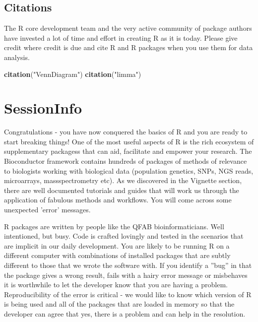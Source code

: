 \documentclass[a4paper]{book}
\newenvironment{Shaded}{\begin{snugshade}}{\end{snugshade}}
\newcommand{\KeywordTok}[1]{\textcolor[rgb]{0.13,0.29,0.53}{\textbf{{#1}}}}
\newcommand{\StringTok}[1]{\textcolor[rgb]{0.31,0.60,0.02}{{#1}}}
\newcommand{\NormalTok}[1]{{#1}}
\renewenvironment{Shaded}
{\vspace{1.5em}\begin{leftbar}\begin{snugshade}}
{\end{snugshade}\end{leftbar}\vspace{3pt}}
\begin{document}
\subsection{Citations}\label{citations}

The R core development team and the very active community of package
authors have invested a lot of time and effort in creating R as it is
today. Please give credit where credit is due and cite R and R packages
when you use them for data analysis.

\begin{Shaded}
\begin{Highlighting}[]
\KeywordTok{citation}\NormalTok{(}\StringTok{"VennDiagram"}\NormalTok{)}
\KeywordTok{citation}\NormalTok{(}\StringTok{"limma"}\NormalTok{)}
\end{Highlighting}
\end{Shaded}

\section{SessionInfo}\label{sessioninfo}

Congratulations - you have now conquered the basics of R and you are
ready to start breaking things! One of the most useful aspects of R is
the rich ecosystem of supplementary packagess that can aid, facilitate
and empower your research. The Bioconductor framework contains hundreds
of packages of methods of relevance to biologists working with
biological data (population genetics, SNPs, NGS reads, microarrays,
massspectrometry etc). As we discovered in the Vignette section, there
are well documented tutorials and guides that will work us through the
application of fabulous methods and workflows. You will come across some
unexpected 'error' messages.

R packages are written by people like the QFAB bioinformaticians. Well
intentioned, but busy. Code is crafted lovingly and tested in the
scenarios that are implicit in our daily development. You are likely to
be running R on a different computer with combinations of installed
packages that are subtly different to those that we wrote the software
with. If you identify a ''bug'' in that the package gives a wrong
result, fails with a hairy error message or misbehaves it is worthwhile
to let the developer know that you are having a problem. Reproducibility
of the error is critical - we would like to know which version of R is
being used and all of the packages that are loaded in memory so that the
developer can agree that yes, there is a problem and can help in the
resolution.
\end{document}
